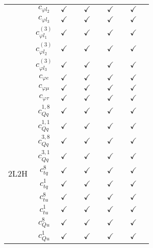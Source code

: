 \documentclass{article}
\begin{document}
\begin{table}[H]
\begin{tabular}{|c|c|c|c|c|c|c|c|c|c|}
 & $c_{\varphi l_2}$ & $\checkmark$ &  & $\checkmark$ &  & $\checkmark$ &  & $\checkmark$ & \\ \cline{2-10}
 & $c_{\varphi l_3}$ & $\checkmark$ &  & $\checkmark$ &  & $\checkmark$ &  & $\checkmark$ & \\ \cline{2-10}
 & $c_{\varphi l_1}^{(3)}$ & $\checkmark$ &  & $\checkmark$ &  & $\checkmark$ &  & $\checkmark$ & \\ \cline{2-10}
 & $c_{\varphi l_2}^{(3)}$ & $\checkmark$ &  & $\checkmark$ &  & $\checkmark$ &  & $\checkmark$ & \\ \cline{2-10}
 & $c_{\varphi l_3}^{(3)}$ & $\checkmark$ &  & $\checkmark$ &  & $\checkmark$ &  & $\checkmark$ & \\ \cline{2-10}
 & $c_{\varphi e}$ & $\checkmark$ &  & $\checkmark$ &  & $\checkmark$ &  & $\checkmark$ & \\ \cline{2-10}
 & $c_{\varphi \mu}$ & $\checkmark$ &  & $\checkmark$ &  & $\checkmark$ &  & $\checkmark$ & \\ \cline{2-10}
 & $c_{\varphi \tau}$ & $\checkmark$ &  & $\checkmark$ &  & $\checkmark$ &  & $\checkmark$ &
\\ \hline
\multirow{14}{*}{2L2H}
 & $c_{Qq}^{1,8}$ & $\checkmark$ &  & $\checkmark$ &  & $\checkmark$ &  & $\checkmark$ & \\ \cline{2-10}
 & $c_{Qq}^{1,1}$ & $\checkmark$ &  & $\checkmark$ &  & $\checkmark$ &  & $\checkmark$ & \\ \cline{2-10}
 & $c_{Qq}^{3,8}$ & $\checkmark$ &  & $\checkmark$ &  & $\checkmark$ &  & $\checkmark$ & \\ \cline{2-10}
 & $c_{Qq}^{3,1}$ & $\checkmark$ &  & $\checkmark$ &  & $\checkmark$ &  & $\checkmark$ & \\ \cline{2-10}
 & $c_{tq}^{8}$ & $\checkmark$ &  & $\checkmark$ &  & $\checkmark$ &  & $\checkmark$ & \\ \cline{2-10}
 & $c_{tq}^{1}$ & $\checkmark$ &  & $\checkmark$ &  & $\checkmark$ &  & $\checkmark$ & \\ \cline{2-10}
 & $c_{tu}^{8}$ & $\checkmark$ &  & $\checkmark$ &  & $\checkmark$ &  & $\checkmark$ & \\ \cline{2-10}
 & $c_{tu}^{1}$ & $\checkmark$ &  & $\checkmark$ &  & $\checkmark$ &  & $\checkmark$ & \\ \cline{2-10}
 & $c_{Qu}^{8}$ & $\checkmark$ &  & $\checkmark$ &  & $\checkmark$ &  & $\checkmark$ & \\ \cline{2-10}
 & $c_{Qu}^{1}$ & $\checkmark$ &  & $\checkmark$ &  & $\checkmark$ &  & $\checkmark$ & \\ \cline{2-10}

\end{tabular}
\end{table}
\end{document}
